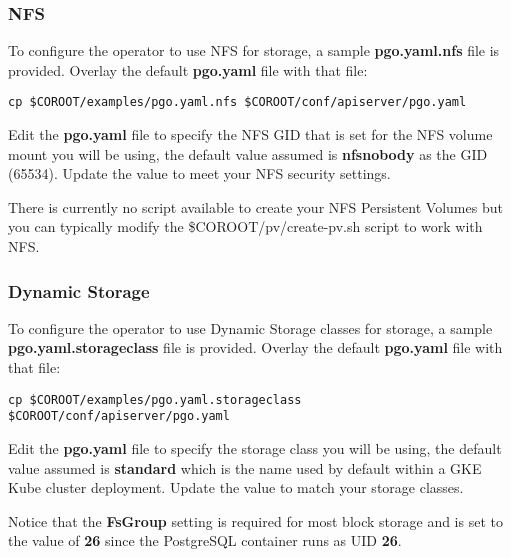 \documentclass[letterpaper,12pt]{article}
\begin{document}
\subsubsection{NFS}\label{/_custom_installation/_specify_storage/_nfs}

To configure the operator to use NFS for storage, a sample \textbf{pgo.yaml.nfs} file is provided. Overlay the default \textbf{pgo.yaml} file with that file:
\vspace{.75em}
\begin{lstlisting}
cp $COROOT/examples/pgo.yaml.nfs $COROOT/conf/apiserver/pgo.yaml
\end{lstlisting}

Edit the \textbf{pgo.yaml} file to specify the NFS GID that is set for the NFS volume mount you will be using, the default value assumed is \textbf{nfsnobody} as the GID (65534). Update the value to meet your NFS security settings.

There is currently no script available to create your NFS Persistent Volumes but you can typically modify the \$COROOT/pv/create-pv.sh script to work with NFS.

\subsubsection{Dynamic Storage}\label{/_custom_installation/_specify_storage/_dynamic_storage}

To configure the operator to use Dynamic Storage classes for storage, a sample \textbf{pgo.yaml.storageclass} file is provided. Overlay the default \textbf{pgo.yaml} file with that file:
\vspace{.75em}
\begin{lstlisting}
cp $COROOT/examples/pgo.yaml.storageclass $COROOT/conf/apiserver/pgo.yaml
\end{lstlisting}

Edit the \textbf{pgo.yaml} file to specify the storage class you will be using, the default value assumed is \textbf{standard} which is the name used by default within a GKE Kube cluster deployment. Update the value to match your storage classes.

Notice that the \textbf{FsGroup} setting is required for most block storage and is set to the value of \textbf{26} since the PostgreSQL container runs as UID \textbf{26}.
\end{document}

